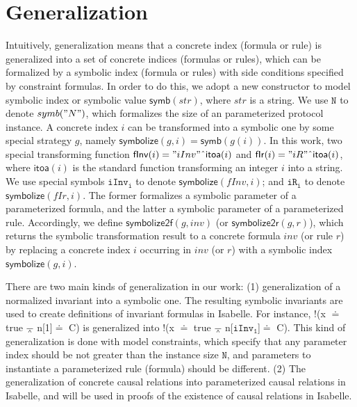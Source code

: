 \documentclass{llncs}
\def \andc {\barwedge }
\def \negc {!}
\def \cat {\symbol{94}}
\def \iInv {iInv}
\def \iR {iR}
\newcommand\cai[1]{\textcolor{blue}{ #1} }
\begin{document}
\section{Generalization}\label{sec:generalization}
\vspace{-0.5cm}%
Intuitively, generalization means that a concrete index (formula or rule) is generalized into a set of concrete indices (formulas or rules), which can be formalized  by a symbolic index (formula or rules) with side conditions  specified by   constraint formulas.     In order to do this, we  adopt a new constructor  to model symbolic index or symbolic value $\mathsf{symb}(str)$, where $str$ is   a string.  We use $\mathtt{N}$ to denote $symb("N")$, which formalizes the size of an parameterized protocol instance. A concrete index $i$ can be transformed into a symbolic one by some special strategy $g$, namely  $\mathsf{symbolize}(g,i)=\mathsf{symb}(g(i))$. In this work, two special transforming function $\mathsf{fInv}(i)="iInv"\cat \mathsf{itoa}(i)$ and $\mathsf{fIr}(i)="iR"\cat \mathsf{itoa}(i)$, where $\mathsf{itoa}(i)$ is the standard function transforming an integer $i$ into a string. We use  special symbols $\mathtt{\iInv_i}$  to denote $\mathsf{symbolize}(fInv,i)$;  and $\mathtt{\iR_i}$ to denote $\mathsf{symbolize}(fIr,i)$. The former formalizes a symbolic parameter of a parameterized   formula, and the latter    a symbolic  parameter of a parameterized rule. Accordingly, we define $\mathsf{symbolize2f}(g,inv)$ (or  $\mathsf{symbolize2r}(g,r)$), which returns the symbolic transformation result to a concrete formula $inv$ (or rule $r$) by replacing a concrete index $i$ occurring in $inv$ (or $r$) with a symbolic index $\mathsf{symbolize}(g,i)$.


There are two
main kinds of generalization in our work: (1) generalization of a normalized invariant into a symbolic one. %
The resulting symbolic invariants are used to create definitions of invariant formulas in Isabelle. For instance,  $\negc$(x $\doteq$ true $\andc$ n[1]$\doteq$ C) is generalized into $\negc$(x $\doteq$ true $\andc$ n[$\mathtt{\iInv_1}$]$\doteq$ C).  This kind of generalization is done with model constraints, which  specify  that any parameter index should be not greater than the instance size $\mathtt{N}$, and parameters to instantiate a parameterized rule (formula) should be different. (2) The generalization of concrete causal relations into parameterized causal relations in Isabelle, and will be used in proofs of the existence  of causal relations in Isabelle.
\end{document}
